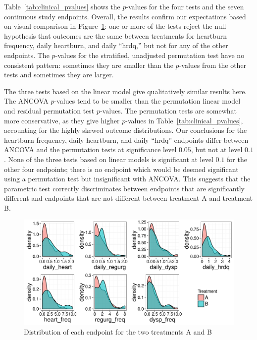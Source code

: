 \documentclass[12pt]{article}
\newcommand{\todo}[1]{{\color{red}{TO DO: \sc #1}}}
\begin{document}
Table~\ref{tab:clinical_pvalues} shows the $p$-values for the four tests and the seven continuous study endpoints.
Overall, the results confirm our expectations based on visual comparison in Figure~\ref{fig:clinical_distr}:
one or more of the tests reject the null hypothesis that outcomes are the same between treatments for heartburn frequency, daily heartburn, and daily ``hrdq,''
but not for any of the other endpoints.
The $p$-values for the stratified, unadjusted permutation test have no consistent pattern: sometimes they are smaller than the $p$-values from the other tests and sometimes they are larger.

The three tests based on the linear model give qualitatively similar results here.
The ANCOVA $p$-values tend to be smaller than the permutation linear model and residual permutation test $p$-values.
The permutation tests are somewhat more conservative, as they give higher $p$-values in Table~\ref{tab:clinical_pvalues}, accounting for the highly skewed outcome distributions. \todo{is this a correct statement? conservative means reject less often}
Our conclusions for the heartburn frequency, daily heartburn, and daily ``hrdq'' endpoints differ between ANCOVA and the permutation tests at significance level $0.05$, but not at level $0.1$.
None of the three tests based on linear models is significant at level $0.1$ for the other four endpoints;
there is no endpoint which would be deemed significant using a permutation test but insignificant with ANCOVA.
This suggests that the parametric test correctly discriminates between endpoints that are significantly different and endpoints that are not different between treatment A and treatment B.


\begin{figure}
\centering
\includegraphics[width = \textwidth]{fig/clinical_distr.pdf}
\caption{Distribution of each endpoint for the two treatments A and B}
\label{fig:clinical_distr}
\end{figure}
\end{document}
